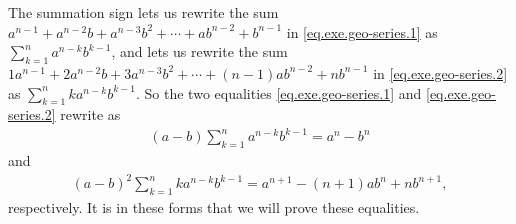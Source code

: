 \documentclass[paper=a4, fontsize=12pt]{scrartcl} %
\newcommand{\tup}[1]{\left( #1 \right)}
\let\sumnonlimits\sum
\renewcommand{\sum}{\sumnonlimits\limits}
\theoremstyle{plainsl}
\theoremstyle{definition}
\theoremstyle{remark}
\begin{document}
The summation sign lets us rewrite the sum
$a^{n-1} + a^{n-2} b + a^{n-3} b^2 + \cdots + a b^{n-2} + b^{n-1}$
in \eqref{eq.exe.geo-series.1} as
$\sum_{k = 1}^n a^{n-k} b^{k-1}$,
and lets us rewrite the sum
$1 a^{n-1} + 2 a^{n-2} b + 3 a^{n-3} b^2 + \cdots + \tup{n-1} a b^{n-2} + n b^{n-1}$
in \eqref{eq.exe.geo-series.2} as
$\sum_{k = 1}^n k a^{n-k} b^{k-1}$.
So the two equalities \eqref{eq.exe.geo-series.1}
and \eqref{eq.exe.geo-series.2} rewrite as
\begin{align}
\tup{a-b} \sum_{k = 1}^n a^{n-k} b^{k-1} = a^n - b^n
\label{eq.exe.geo-series.1'}
\end{align}
and
\begin{align}
\tup{a-b}^2 \sum_{k = 1}^n k a^{n-k} b^{k-1}
= a^{n+1} - \tup{n+1} a b^n + n b^{n+1} ,
\label{eq.exe.geo-series.2'}
\end{align}
respectively.
It is in these forms that we will prove these equalities.
\end{document}
